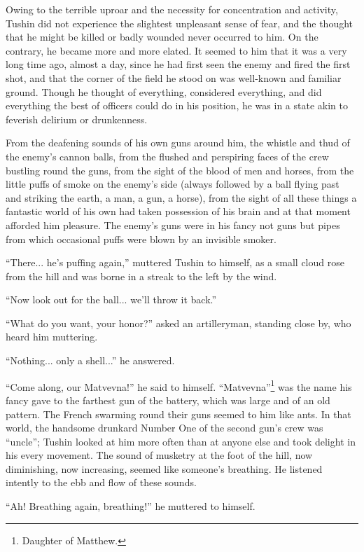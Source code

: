 Owing to the terrible uproar and the necessity for concentration
and activity, Tushin did not experience the slightest unpleasant
sense of fear, and the thought that he might be killed or badly
wounded never occurred to him. On the contrary, he became more
and more elated. It seemed to him that it was a very long time
ago, almost a day, since he had first seen the enemy and fired
the first shot, and that the corner of the field he stood on was
well-known and familiar ground. Though he thought of everything,
considered everything, and did everything the best of officers
could do in his position, he was in a state akin to feverish
delirium or drunkenness.

From the deafening sounds of his own guns around him, the whistle
and thud of the enemy's cannon balls, from the flushed and
perspiring faces of the crew bustling round the guns, from the
sight of the blood of men and horses, from the little puffs of
smoke on the enemy's side (always followed by a ball flying past
and striking the earth, a man, a gun, a horse), from the sight of
all these things a fantastic world of his own had taken
possession of his brain and at that moment afforded him
pleasure. The enemy's guns were in his fancy not guns but pipes
from which occasional puffs were blown by an invisible smoker.

``There... he's puffing again,'' muttered Tushin to himself, as a
small cloud rose from the hill and was borne in a streak to the
left by the wind.

``Now look out for the ball... we'll throw it back.''

``What do you want, your honor?'' asked an artilleryman, standing
close by, who heard him muttering.

``Nothing... only a shell...'' he answered.

``Come along, our Matvevna!'' he said to
himself. ``Matvevna''\footnote{Daughter of Matthew.}  was the
name his fancy gave to the farthest gun of the battery, which was
large and of an old pattern. The French swarming round their guns
seemed to him like ants. In that world, the handsome drunkard
Number One of the second gun's crew was ``uncle''; Tushin looked
at him more often than at anyone else and took delight in his
every movement. The sound of musketry at the foot of the hill,
now diminishing, now increasing, seemed like someone's
breathing. He listened intently to the ebb and flow of these
sounds.

``Ah! Breathing again, breathing!'' he muttered to himself.

